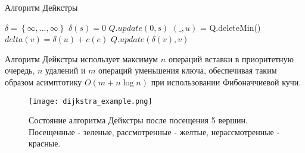 \begin{algorithm}[!h]
	\caption{Алгоритм Дейкстры}\label{lst1}
	\begin{algorithmic}
		\State $\delta = \left\{\infty, ..., \infty\right\}$ 
		\State $\delta(s) = 0$ 
		\State $Q.update(0, s)$ 
			\State $(\_, u)$ = Q.deleteMin() 
			 
					\State $delta(v) = \delta(u) + c(e)$
					\State $Q.update(\delta(v), v)$
				\EndIf
			\EndFor
		\EndWhile
		\EndFunction
	\end{algorithmic}
\end{algorithm}

Алгоритм Дейкстры использует максимум $n$ операций вставки в приоритетную очередь, $n$ удалений и $m$ операций уменьшения ключа, обеспечивая таким образом асимптотику $O(m + n \log n)$ при использовании Фибоначчиевой кучи.

\begin{figure}[!h]
	\centering
	\texttt{[image: dijkstra\_example.png]}
	\caption{Состояние алгоритма Дейкстры после посещения 5 вершин. Посещенные - зеленые, рассмотренные - желтые, нерассмотренные - красные.}\label{fig1}
\end{figure}

\FloatBarrier
